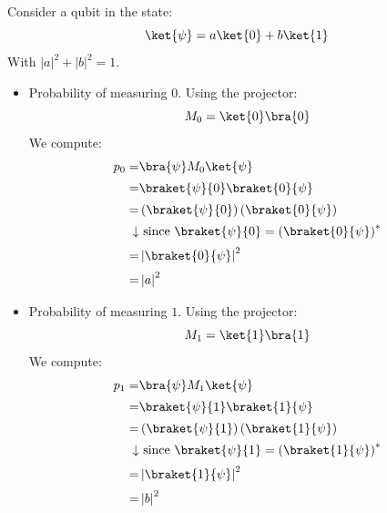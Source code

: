 \highspace
\begin{examplebox}
    Consider a qubit in the state:
    \begin{equation*}
        \ket{\psi} = a \ket{0} + b \ket{1}
    \end{equation*}
    With $\left|a\right|^2 + \left|b\right|^2 = 1$.
    \begin{itemize}
        \item Probability of measuring $0$. Using the projector:
        \begin{equation*}
            M_0 = \ket{0}\bra{0}
        \end{equation*}
        We compute:
        \begin{align*}
            p_0 =& \bra{\psi} M_0 \ket{\psi} \\[.2em]
            =& \braket{\psi}{0} \braket{0}{\psi} \\[.2em]
            =& \left(\braket{\psi}{0}\right) \left(\braket{0}{\psi}\right) \\[.2em]
            \downarrow& \text{ since } \braket{\psi}{0} = \left(\braket{0}{\psi}\right)^* \\[.2em]
            =& \left|\braket{0}{\psi}\right|^2 \\[.2em]
            =& \left|a\right|^2
        \end{align*}


        \item Probability of measuring $1$. Using the projector:
        \begin{equation*}
            M_1 = \ket{1}\bra{1}
        \end{equation*}
        We compute:
        \begin{align*}
            p_1 =& \bra{\psi} M_1 \ket{\psi} \\[.2em]
            =& \braket{\psi}{1} \braket{1}{\psi} \\[.2em]
            =& \left(\braket{\psi}{1}\right) \left(\braket{1}{\psi}\right) \\[.2em]
            \downarrow& \text{ since } \braket{\psi}{1} = \left(\braket{1}{\psi}\right)^* \\[.2em]
            =& \left|\braket{1}{\psi}\right|^2 \\[.2em]
            =& \left|b\right|^2
        \end{align*}
    \end{itemize}
\end{examplebox}

